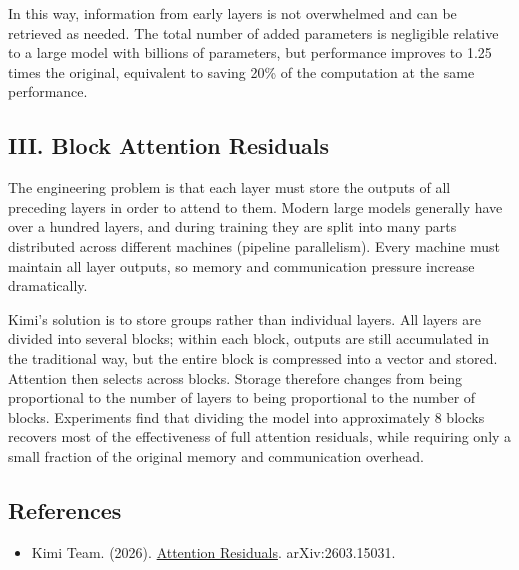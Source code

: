 In this way, information from early layers is not overwhelmed and can be retrieved as needed. The total number of added parameters is negligible relative to a large model with billions of parameters, but performance improves to 1.25 times the original, equivalent to saving 20\% of the computation at the same performance.

\hypertarget{iii.-block-attention-residuals}{%
\subsection{III. Block Attention Residuals}\label{iii.-block-attention-residuals}}

The engineering problem is that each layer must store the outputs of all preceding layers in order to attend to them. Modern large models generally have over a hundred layers, and during training they are split into many parts distributed across different machines (pipeline parallelism). Every machine must maintain all layer outputs, so memory and communication pressure increase dramatically.

Kimi's solution is to store groups rather than individual layers. All layers are divided into several blocks; within each block, outputs are still accumulated in the traditional way, but the entire block is compressed into a vector and stored. Attention then selects across blocks. Storage therefore changes from being proportional to the number of layers to being proportional to the number of blocks. Experiments find that dividing the model into approximately 8 blocks recovers most of the effectiveness of full attention residuals, while requiring only a small fraction of the original memory and communication overhead.

\FloatBarrier
{}
\hypertarget{references-104}{%
\subsection{References}\label{references-104}}

\vspace{0.25em}
\begin{itemize}
\tightlist
\item
  Kimi Team. (2026). \href{https://arxiv.org/abs/2603.15031}{Attention Residuals}. arXiv:2603.15031.
\end{itemize}

\clearpage
